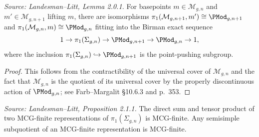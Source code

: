 \begin{lemma}
  \label{lem:birman-exact-sequence}
  \textit{Source: Landesman--Litt, Lemma 2.0.1.}
  For basepoints $m \in \mathcal{M}_{g,n}$ and $m' \in \mathcal{M}_{g,n+1}$
  lifting $m$, there are isomorphisms
  $\pi_1(\mathcal{M}_{g,n+1}, m') \cong \PMod_{g,n+1}$ and
  $\pi_1(\mathcal{M}_{g,n}, m) \cong \PMod_{g,n}$
  fitting into the Birman exact sequence
  \[
    1 \to \pi_1(\Sigma_{g,n}) \to \PMod_{g,n+1} \to \PMod_{g,n} \to 1,
  \]
  where the inclusion $\pi_1(\Sigma_{g,n}) \hookrightarrow \PMod_{g,n+1}$
  is the point-pushing subgroup.
\end{lemma}

\begin{proof}
  This follows from the contractibility of the universal cover of
  $\mathcal{M}_{g,n}$ and the fact that $\mathcal{M}_{g,n}$ is the quotient
  of its universal cover by the properly discontinuous action of $\PMod_{g,n}$;
  see Farb--Margalit \S10.6.3 and p.~353.
\end{proof}

\begin{proposition}
  \label{prop:mcg-finite-basic}
  \textit{Source: Landesman--Litt, Proposition 2.1.1.}
  The direct sum and tensor product of two MCG-finite representations of
  $\pi_1(\Sigma_{g,n})$ is MCG-finite.
  Any semisimple subquotient of an MCG-finite representation is MCG-finite.
\end{proposition}

